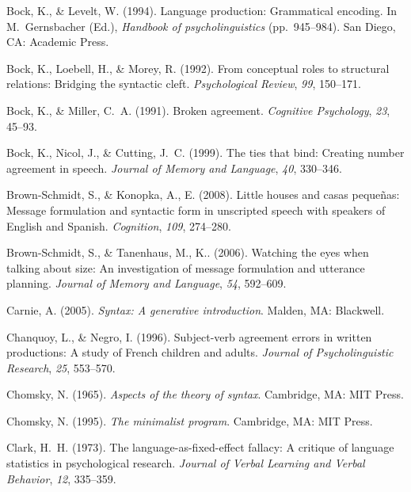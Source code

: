 \documentclass[12pt,titlepage]{article}
\newcommand{\itt}{\textit}  %
\begin{document}
\begin{description}
    \item Bock, K., \& Levelt, W\@.  (1994).  Language production:
    Grammatical encoding.  In M.~Gernsbacher (Ed.), \itt{Handbook of
    psycholinguistics} (pp.~945--984).  San Diego, CA: Academic Press.
    
    \item Bock, K., Loebell, H., \& Morey, R\@.  (1992).  From conceptual 
    roles to structural relations:  Bridging the syntactic cleft.  
    \itt{Psychological Review}, \itt{99}, 150--171.

    \item Bock, K., \& Miller, C.~A\@.  (1991).  Broken agreement.
    \itt{Cognitive Psychology}, \itt{23}, 45--93.

    \item Bock, K., Nicol, J., \& Cutting, J.~C\@.  (1999).  The ties that
    bind: Creating number agreement in speech.  \itt{Journal of Memory and
    Language}, \itt{40}, 330--346.
    
    \item Brown-Schmidt, S., \& Konopka, A., E\@.  (2008).  Little houses
    and casas peque\~{n}as: Message formulation and syntactic form in
    unscripted speech with speakers of English and Spanish.
    \itt{Cognition}, \itt{109}, 274--280.
    
    \item Brown-Schmidt, S., \& Tanenhaus, M., K.\@.  (2006).  Watching the
    eyes when talking about size: An investigation of message formulation
    and utterance planning.  \itt{Journal of Memory and Language},
    \itt{54}, 592--609.
    
    \item Carnie, A. (2005).  \itt{Syntax: A generative introduction}.
    Malden, MA: Blackwell.
    
    \item Chanquoy, L., \& Negro, I\@.  (1996).  Subject-verb agreement
    errors in written productions: A study of French children and adults.
    \itt{Journal of Psycholinguistic Research}, \itt{25}, 553--570.
   
    \item Chomsky, N\@.  (1965).  \itt{Aspects of the theory of syntax}.
    Cambridge, MA: MIT Press.
   
    \item Chomsky, N\@.  (1995).  \itt{The minimalist program}.  Cambridge,
    MA: MIT Press.

    \item Clark, H.~H\@.  (1973).  The language-as-fixed-effect fallacy: A
    critique of language statistics in psychological research.
    \itt{Journal of Verbal Learning and Verbal Behavior}, \itt{12},
    335--359.
    

\end{description}
\end{document}
